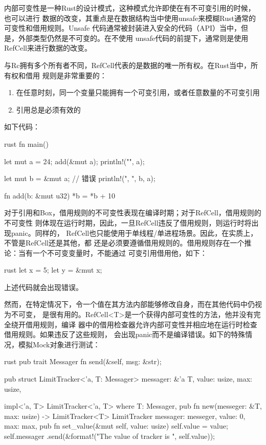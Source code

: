 内部可变性是一种Rust的设计模式，这种模式允许即使在有不可变引用的时候，也可以进行
数据的改变，其重点是在数据结构当中使用unsafe来模糊Rust通常的可变性和借用规则。Unsafe
代码通常被封装进入安全的代码（API）当中，但是，外部类型仍然是不可变的。在不使用
unsafe代码的前提下，通常则是使用RefCell来进行数据的改变。

与Rc拥有多个所有者不同，RefCell代表的是数据的唯一所有权。在Rust当中，所有权和借用
规则是非常重要的：
\begin{enumerate}
  \item 在任意时刻，同一个变量只能拥有一个可变引用，或者任意数量的不可变引用
  \item 引用总是必须有效的
\end{enumerate}
如下代码：
\begin{code-block}{rust}
fn main() {
    let mut a = 24;
    add(&mut a);
    println!("{}", a);

    let mut b = &mut a;
    // 错误
    println!("{}, {}", b, a);
}
fn add(b: &mut u32) {
    *b = *b + 10
}
\end{code-block}

对于引用和Box，借用规则的不可变性表现在编译时期；对于RefCell，借用规则的不可变性
则体现在运行时期，因此，一旦RefCell违反了借用规则，则运行时将出现panic。同样的，
RefCell也只能使用于单线程/单进程场景。因此，在实质上，不管是RefCell还是其他，都
还是必须要遵循借用规则的。借用规则存在一个推论：当有一个不可变变量时，不能通过
可变引用借用他，如下：
\begin{code-block}{rust}
let x = 5;
let y = &mut x;
\end{code-block}
上述代码就会出现错误。

然而，在特定情况下，令一个值在其方法内部能够修改自身，而在其他代码中仍视为不可变，
是很有用的。RefCell<T>是一个获得内部可变性的方法，他并没有完全绕开借用规则，编译
器中的借用检查器允许内部可变性并相应地在运行时检查借用规则。如果违反了这些规则，
会出现panic而不是编译错误。如下的特殊情况，模拟Mock对象进行测试：
\begin{code-block}{rust}
pub trait Messager {
    fn send(&self, msg: &str);
}

pub struct LimitTracker<'a, T: Messager> {
    messager: &'a T,
    value: usize,
    max: usize,
}

impl<'a, T> LimitTracker<'a, T>
where
    T: Messager,
{
    pub fn new(messeger: &T, max: usize) -> LimitTracker<T> {
        LimitTracker {
            messager: messeger,
            value: 0,
            max: max,
        }
    }
    pub fn set_value(&mut self, value: usize) {
        self.value = value;
        self.messager
            .send(&format!("The value of tracker is {}", self.value));
    }
}
\end{code-block}


